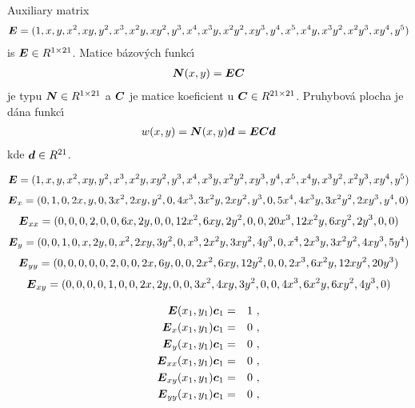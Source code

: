 Auxiliary matrix
\begin{eqnarray}
\mbox{\boldmath$E$} = (1,x,y,x^2,xy,y^2,x^3,x^2y,xy^2,y^3,x^4,x^3y,x^2y^2,xy^3,y^4,x^5,x^4y,x^3y^2,x^2y^3,xy^4,y^5)
\end{eqnarray}
is $\mbox{\boldmath$E$} \in R^{1 \times 21}$.
Matice b\'{a}zov\'{y}ch funkc\'{\i}
\begin{eqnarray}
\mbox{\boldmath$N$}(x,y) = \mbox{\boldmath$E$} \mbox{\boldmath$C$}
\end{eqnarray}
je typu $\mbox{\boldmath$N$} \in R^{1 \times 21}$ a $\mbox{\boldmath$C$}$ je matice koeficient u
$\mbox{\boldmath$C$} \in R^{21 \times 21}$.
Pruhybov\'{a} plocha je d\'{a}na funkc\'{\i}
\begin{eqnarray}
w(x,y) = \mbox{\boldmath$N$}(x,y) \mbox{\boldmath$d$} = \mbox{\boldmath$E$} \mbox{\boldmath$C$} \mbox{\boldmath$d$}
\end{eqnarray}
kde $\mbox{\boldmath$d$} \in R^{21}$.

\begin{eqnarray}
\mbox{\boldmath$E$} = (1, x, y, x^2, xy, y^2, x^3, x^2y, xy^2, y^3, x^4, x^3y, x^2y^2, xy^3, y^4, x^5, x^4y, x^3y^2, x^2y^3, xy^4, y^5)
\end{eqnarray}
\begin{eqnarray}
\mbox{\boldmath$E$}_x = (0, 1, 0, 2x, y, 0, 3x^2, 2xy, y^2, 0, 4x^3, 3x^2y, 2xy^2, y^3, 0, 5x^4, 4x^3y, 3x^2y^2, 2xy^3, y^4, 0)
\end{eqnarray}
\begin{eqnarray}
\mbox{\boldmath$E$}_{xx} = (0, 0, 0, 2, 0, 0, 6x, 2y, 0, 0, 12x^2, 6xy, 2y^2, 0, 0, 20x^3, 12x^2y, 6xy^2, 2y^3, 0, 0)
\end{eqnarray}
\begin{eqnarray}
\mbox{\boldmath$E$}_y = (0, 0, 1, 0, x, 2y, 0, x^2, 2xy, 3y^2, 0, x^3, 2x^2y, 3xy^2, 4y^3, 0, x^4, 2x^3y, 3x^2y^2, 4xy^3, 5y^4)
\end{eqnarray}
\begin{eqnarray}
\mbox{\boldmath$E$}_{yy} = (0, 0, 0, 0, 0, 2, 0, 0, 2x, 6y, 0, 0, 2x^2, 6xy, 12y^2, 0, 0, 2x^3, 6x^2y, 12xy^2, 20y^3)
\end{eqnarray}
\begin{eqnarray}
\mbox{\boldmath$E$}_{xy} = (0, 0, 0, 0, 1, 0, 0, 2x, 2y, 0, 0, 3x^2, 4xy, 3y^2, 0, 0, 4x^3, 6x^2y, 6xy^2, 4y^3, 0)
\end{eqnarray}

\begin{eqnarray}
\mbox{\boldmath$E$}(x_1,y_1) \mbox{\boldmath$c$}_1 &=& 1\ ,
\\
\mbox{\boldmath$E$}_x(x_1,y_1) \mbox{\boldmath$c$}_1 &=& 0\ ,
\\
\mbox{\boldmath$E$}_y(x_1,y_1) \mbox{\boldmath$c$}_1 &=& 0\ ,
\\
\mbox{\boldmath$E$}_{xx}(x_1,y_1) \mbox{\boldmath$c$}_1 &=& 0\ ,
\\
\mbox{\boldmath$E$}_{xy}(x_1,y_1) \mbox{\boldmath$c$}_1 &=& 0\ ,
\\
\mbox{\boldmath$E$}_{yy}(x_1,y_1) \mbox{\boldmath$c$}_1 &=& 0\ ,
\\
\end{eqnarray}

